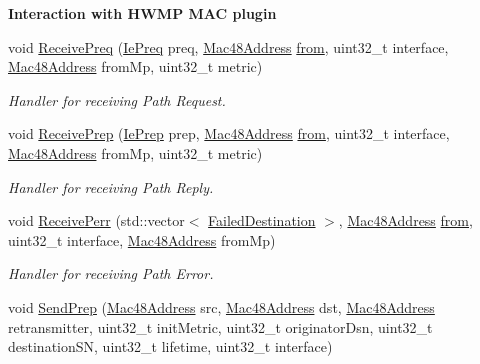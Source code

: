 \begin{Indent}{\bf Interaction with H\+W\+MP M\+AC plugin}\par
\begin{DoxyCompactItemize}
\item 
void \hyperlink{classns3_1_1dot11s_1_1HwmpProtocol_ac50e179d526367f5280cca0710fb4418}{Receive\+Preq} (\hyperlink{classns3_1_1dot11s_1_1IePreq}{Ie\+Preq} preq, \hyperlink{classns3_1_1Mac48Address}{Mac48\+Address} \hyperlink{lte__amc_8m_a1b4c81ff74eb1a626b5ade44c81004b3}{from}, uint32\+\_\+t interface, \hyperlink{classns3_1_1Mac48Address}{Mac48\+Address} from\+Mp, uint32\+\_\+t metric)
\begin{DoxyCompactList}\small\item\em Handler for receiving Path Request. \end{DoxyCompactList}\item 
void \hyperlink{classns3_1_1dot11s_1_1HwmpProtocol_a142901f91234cf4ea4bf788619be0370}{Receive\+Prep} (\hyperlink{classns3_1_1dot11s_1_1IePrep}{Ie\+Prep} prep, \hyperlink{classns3_1_1Mac48Address}{Mac48\+Address} \hyperlink{lte__amc_8m_a1b4c81ff74eb1a626b5ade44c81004b3}{from}, uint32\+\_\+t interface, \hyperlink{classns3_1_1Mac48Address}{Mac48\+Address} from\+Mp, uint32\+\_\+t metric)
\begin{DoxyCompactList}\small\item\em Handler for receiving Path Reply. \end{DoxyCompactList}\item 
void \hyperlink{classns3_1_1dot11s_1_1HwmpProtocol_a1ab4a7481dbe089e226925e685337710}{Receive\+Perr} (std\+::vector$<$ \hyperlink{structns3_1_1dot11s_1_1HwmpProtocol_1_1FailedDestination}{Failed\+Destination} $>$, \hyperlink{classns3_1_1Mac48Address}{Mac48\+Address} \hyperlink{lte__amc_8m_a1b4c81ff74eb1a626b5ade44c81004b3}{from}, uint32\+\_\+t interface, \hyperlink{classns3_1_1Mac48Address}{Mac48\+Address} from\+Mp)
\begin{DoxyCompactList}\small\item\em Handler for receiving Path Error. \end{DoxyCompactList}\item 
void \hyperlink{classns3_1_1dot11s_1_1HwmpProtocol_a61cb0a88964f864c0cc8480160c4689b}{Send\+Prep} (\hyperlink{classns3_1_1Mac48Address}{Mac48\+Address} src, \hyperlink{classns3_1_1Mac48Address}{Mac48\+Address} dst, \hyperlink{classns3_1_1Mac48Address}{Mac48\+Address} retransmitter, uint32\+\_\+t init\+Metric, uint32\+\_\+t originator\+Dsn, uint32\+\_\+t destination\+SN, uint32\+\_\+t lifetime, uint32\+\_\+t interface)

\end{DoxyCompactItemize}
\end{Indent}
